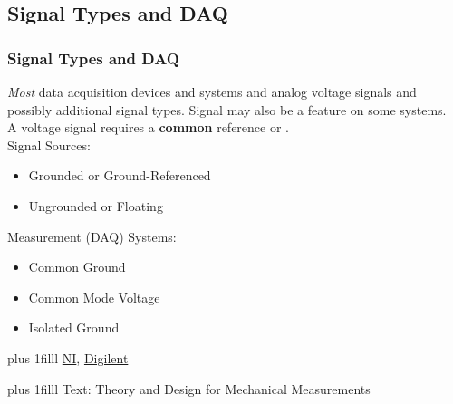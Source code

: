 \documentclass[fleqn]{beamer} %
\newcommand{\sectionIIsubsectionItitle}{Signal Types and DAQ}
\newcommand{\btVFill}{\vskip0pt plus 1filll}
\begin{document}
		\subsection{\sectionIIsubsectionItitle}\label{sectionIIsubsectionI}

			\begin{frame}[label=sectionIIsubsectionI]
				\frametitle{\sectionIIsubsectionItitle} \scriptsize

				\bigskip	

				{\it Most} data acquisition devices and systems \underline{\hspace{20mm}} and \underline{\hspace{20mm}} {\BL analog} voltage signals and possibly additional signal types. Signal \underline{\hspace{20mm}} may also be a feature on some systems. \vspace{5mm}\\

				A voltage signal requires a {\bf common} reference or \underline{\hspace{20mm}}.	\vspace{2mm}\\

				Signal Sources:
				\begin{itemize}
					\item Grounded or Ground-Referenced	\vspace{2mm}\\

					\item Ungrounded or Floating \vspace{2mm}\\		

				\end{itemize}	
				\vspace*{5mm}

				Measurement (DAQ) Systems:
				\begin{itemize}
					\item Common Ground \vspace{2mm}\\

					\item Common Mode Voltage \vspace{2mm}\\

					\item Isolated Ground \vspace{2mm}\\

				\end{itemize}
				

				\btVFill
				\tiny{\href{https://www.ni.com/en/support/documentation/supplemental/06/grounding-considerations---intermediate-analog-concepts.html}{NI},}
				\tiny{\href{https://digilent.com/reference/daq-and-datalogging/documents/analog-input-signal-connections-1}{Digilent}}

				\btVFill
				\tiny{Text: Theory and Design for Mechanical Measurements}
		
			\end{frame}
\end{document}
